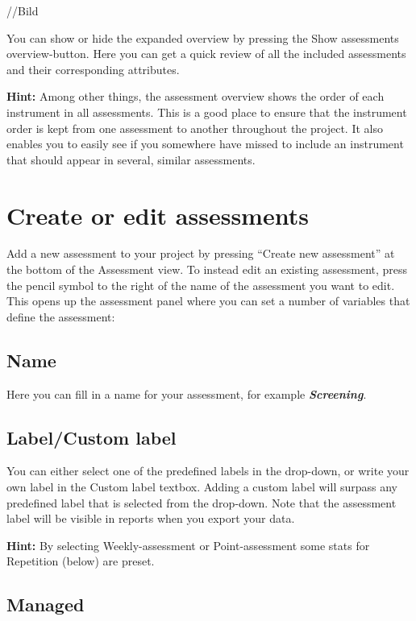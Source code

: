 \documentclass[]{book}
\begin{document}
//Bild

You can show or hide the expanded overview by pressing the Show assessments overview-button. Here you can get a quick review of all the included assessments and their corresponding attributes.

\textbf{Hint:} Among other things, the assessment overview shows the order of each instrument in all assessments. This is a good place to ensure that the instrument order is kept from one assessment to another throughout the project. It also enables you to easily see if you somewhere have missed to include an instrument that should appear in several, similar assessments.

\hypertarget{create-or-edit-assessments}{%
\section{Create or edit assessments}\label{create-or-edit-assessments}}

Add a new assessment to your project by pressing ``Create new assessment'' at the bottom of the Assessment view. To instead edit an existing assessment, press the pencil symbol to the right of the name of the assessment you want to edit. This opens up the assessment panel where you can set a number of variables that define the assessment:

\hypertarget{name}{%
\subsection{Name}\label{name}}

Here you can fill in a name for your assessment, for example \textbf{\emph{Screening}}.

\hypertarget{labelcustom-label}{%
\subsection{Label/Custom label}\label{labelcustom-label}}

You can either select one of the predefined labels in the drop-down, or write your own label in the Custom label textbox. Adding a custom label will surpass any predefined label that is selected from the drop-down. Note that the assessment label will be visible in reports when you export your data.

\textbf{Hint:} By selecting Weekly-assessment or Point-assessment some stats for Repetition (below) are preset.

\hypertarget{managed}{%
\subsection{Managed}\label{managed}}
\end{document}
